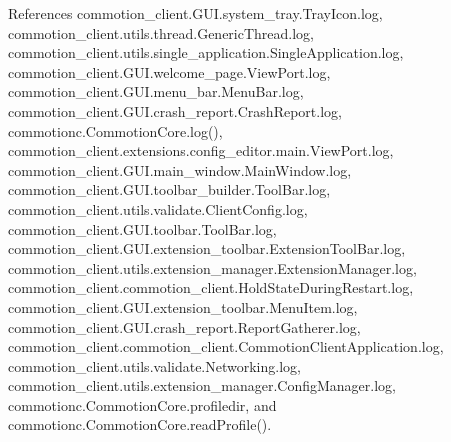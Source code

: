 References commotion\+\_\+client.\+G\+U\+I.\+system\+\_\+tray.\+Tray\+Icon.\+log, commotion\+\_\+client.\+utils.\+thread.\+Generic\+Thread.\+log, commotion\+\_\+client.\+utils.\+single\+\_\+application.\+Single\+Application.\+log, commotion\+\_\+client.\+G\+U\+I.\+welcome\+\_\+page.\+View\+Port.\+log, commotion\+\_\+client.\+G\+U\+I.\+menu\+\_\+bar.\+Menu\+Bar.\+log, commotion\+\_\+client.\+G\+U\+I.\+crash\+\_\+report.\+Crash\+Report.\+log, commotionc.\+Commotion\+Core.\+log(), commotion\+\_\+client.\+extensions.\+config\+\_\+editor.\+main.\+View\+Port.\+log, commotion\+\_\+client.\+G\+U\+I.\+main\+\_\+window.\+Main\+Window.\+log, commotion\+\_\+client.\+G\+U\+I.\+toolbar\+\_\+builder.\+Tool\+Bar.\+log, commotion\+\_\+client.\+utils.\+validate.\+Client\+Config.\+log, commotion\+\_\+client.\+G\+U\+I.\+toolbar.\+Tool\+Bar.\+log, commotion\+\_\+client.\+G\+U\+I.\+extension\+\_\+toolbar.\+Extension\+Tool\+Bar.\+log, commotion\+\_\+client.\+utils.\+extension\+\_\+manager.\+Extension\+Manager.\+log, commotion\+\_\+client.\+commotion\+\_\+client.\+Hold\+State\+During\+Restart.\+log, commotion\+\_\+client.\+G\+U\+I.\+extension\+\_\+toolbar.\+Menu\+Item.\+log, commotion\+\_\+client.\+G\+U\+I.\+crash\+\_\+report.\+Report\+Gatherer.\+log, commotion\+\_\+client.\+commotion\+\_\+client.\+Commotion\+Client\+Application.\+log, commotion\+\_\+client.\+utils.\+validate.\+Networking.\+log, commotion\+\_\+client.\+utils.\+extension\+\_\+manager.\+Config\+Manager.\+log, commotionc.\+Commotion\+Core.\+profiledir, and commotionc.\+Commotion\+Core.\+read\+Profile().


